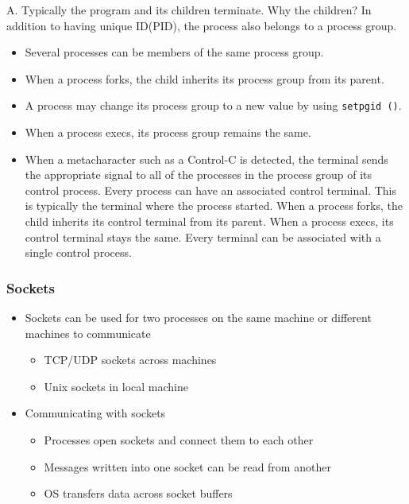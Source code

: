 \documentclass{article}
\begin{document}
A. Typically the program and its children terminate. Why the children? In addition to having unique ID(PID), the process also belongs to a process group.
\begin{itemize}
    \item Several processes can be members of the same process group.
    \item When a process forks, the child inherits its process group from its parent.
    \item A process may change its process group to a new value by using \texttt{setpgid ()}.
    \item When a process execs, its process group remains the same.
    \item When a metacharacter such as a Control-C is detected, the terminal sends the appropriate signal to all of the processes in the process group of its control process. Every process can have an associated control terminal. This is typically the terminal where the process started. When a process forks, the child inherits its control terminal from its parent. When a process execs, its control terminal stays the same. Every terminal can be associated with a single control process.
\end{itemize}

\subsubsection{Sockets}
\begin{itemize}
    \item Sockets can be used for two processes on the same machine or different machines to communicate
    \begin{itemize}
        \item TCP/UDP sockets across machines
        \item Unix sockets in local machine
    \end{itemize}
    \item Communicating with sockets 
    \begin{itemize}
        \item Processes open sockets and connect them to each other
        \item Messages written into one socket can be read from another
        \item OS transfers data across socket buffers
    \end{itemize}
\end{itemize}
\end{document}
